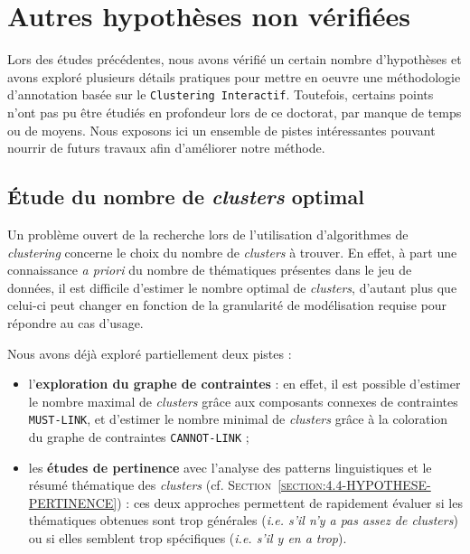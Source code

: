 \section{Autres hypothèses non vérifiées}
\label{section:4.7-HYPOTHESES-NON-VERIFIEES}

	Lors des études précédentes, nous avons vérifié un certain nombre d'hypothèses et avons exploré plusieurs détails pratiques pour mettre en oeuvre une méthodologie d'annotation basée sur le \texttt{Clustering Interactif}.
	Toutefois, certains points n'ont pas pu être étudiés en profondeur lors de ce doctorat, par manque de temps ou de moyens.
	Nous exposons ici un ensemble de pistes intéressantes pouvant nourrir de futurs travaux afin d'améliorer notre méthode.
	
	
	\subsection{Étude du nombre de \textit{clusters} optimal}
	\label{section:4.7.1-HYPOTHESES-NON-VERIFIEES-NOMBRE-CLUSTERS}
	
		Un problème ouvert de la recherche lors de l'utilisation d'algorithmes de \textit{clustering} concerne le choix du nombre de \textit{clusters} à trouver.
		En effet, à part une connaissance \textit{a priori} du nombre de thématiques présentes dans le jeu de données, il est difficile d'estimer le nombre optimal de \textit{clusters}, d'autant plus que celui-ci peut changer en fonction de la granularité de modélisation requise pour répondre au cas d'usage.
		
		Nous avons déjà exploré partiellement deux pistes :
		\begin{itemize}
			\item l'\textbf{exploration du graphe de contraintes} : en effet, il est possible d'estimer le nombre maximal de \textit{clusters} grâce aux composants connexes de contraintes \texttt{MUST-LINK}, et d'estimer le nombre minimal de \textit{clusters} grâce à la coloration du graphe de contraintes \texttt{CANNOT-LINK} ;
			\item les \textbf{études de pertinence} avec l'analyse des patterns linguistiques et le résumé thématique des \textit{clusters} (cf. \textsc{Section~\ref{section:4.4-HYPOTHESE-PERTINENCE}}) : ces deux approches permettent de rapidement évaluer si les thématiques obtenues sont trop générales (\textit{i.e. s'il n'y a pas assez de clusters}) ou si elles semblent trop spécifiques (\textit{i.e. s'il y en a trop}).
		\end{itemize}
		
